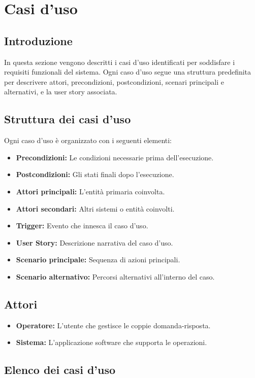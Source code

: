 \documentclass[a4paper, 12pt]{article}
\begin{document}
\section{Casi d'uso}
\subsection{Introduzione}
In questa sezione vengono descritti i casi d'uso identificati per soddisfare i requisiti funzionali del sistema. Ogni caso d'uso segue una struttura predefinita per descrivere attori, precondizioni, postcondizioni, scenari principali e alternativi, e la user story associata.

\subsection{Struttura dei casi d'uso}
Ogni caso d'uso è organizzato con i seguenti elementi:
\begin{itemize}
    \item \textbf{Precondizioni:} Le condizioni necessarie prima dell'esecuzione.
    \item \textbf{Postcondizioni:} Gli stati finali dopo l'esecuzione.
    \item \textbf{Attori principali:} L'entità primaria coinvolta.
    \item \textbf{Attori secondari:} Altri sistemi o entità coinvolti.
    \item \textbf{Trigger:} Evento che innesca il caso d'uso.
    \item \textbf{User Story:} Descrizione narrativa del caso d'uso.
    \item \textbf{Scenario principale:} Sequenza di azioni principali.
    \item \textbf{Scenario alternativo:} Percorsi alternativi all'interno del caso.
\end{itemize}

\subsection{Attori}
\begin{itemize}
    \item \textbf{Operatore:} L'utente che gestisce le coppie domanda-risposta.
    \item \textbf{Sistema:} L'applicazione software che supporta le operazioni.
\end{itemize}

\subsection{Elenco dei casi d'uso}
\end{document}
